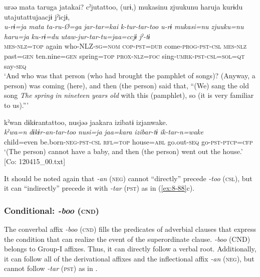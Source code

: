\ex
{\TM}
\glll  urəə  mata  taruga  jatakai?      cˀjutattoo,  (urɨ,)  mukasinu  {\textbar}zjuukunu      haru{\textbar}ja  kurɨdu  utajutattujaacjɨ  jˀicjɨ,\\
\textit{u-rɨ=ja}  \textit{mata}  \textit{ta-ru-Ø=ga}  \textit{jar-tar=kai}      \textit{k-tur-tar-too}  \textit{u-rɨ}  \textit{mukasi=nu}  \textit{zjuuku=nu}      \textit{haru=ja}  \textit{ku-rɨ=du}  \textit{utaw-jur-tar-tu=jaa=ccjɨ}  \textit{jˀ-tɨ}\\
\textsc{mes}-\textsc{nlz}=\textsc{top}  again  who-NLZ-\textsc{sg}=\textsc{nom}  \textsc{cop}-\textsc{pst}=\textsc{dub}      come-\textsc{prog}-\textsc{pst}-\textsc{csl}  \textsc{mes}-\textsc{nlz}  past=\textsc{gen}  ten.nine=\textsc{gen}  spring=\textsc{top}  \textsc{prox}-\textsc{nlz}=\textsc{foc}  sing-\textsc{umrk}-\textsc{pst}-\textsc{csl}=\textsc{sol}=\textsc{qt}  say-\textsc{seq}\\
\glt ‘And who was that person (who had brought the pamphlet of songs)? (Anyway, a person) was coming (here), and then (the person) said that, “(We) sang the old song \textit{The} \textit{spring} \textit{in} \textit{nineteen} \textit{years} \textit{old} with this (pamphlet), so (it is very familiar to us).”’

\ex
{\TM}
\glll  kˀwan  dɨkɨrantattoo,  nusjəə  jaakara      izibatɨ  izjanwake.\\
\textit{kˀwa=n}  \textit{dɨkɨr-an-tar-too}  \textit{nusi=ja}  \textit{jaa=kara}     \textit{izibar-tɨ}  \textit{ik-tar-n=wake}\\
child=even  be.born-\textsc{neg}-\textsc{pst}-\textsc{csl}  \textsc{rfl}=\textsc{top}  house=\textsc{abl}   go.out-\textsc{seq}  go-\textsc{pst}-\textsc{ptcp}=\textsc{cfp}\\
\glt ‘(The person) cannot have a baby, and then (the person) went out the house.’ [Co: 120415\_00.txt]
\z
\z

It should be noted again that \textit{-an} (\textsc{neg}) cannot “directly” precede \textit{-too} (\textsc{csl}), but it can “indirectly” precede it with \textit{-tar} (\textsc{pst}) as in (\ref{ex:8-88}c).

\subsubsection{Conditional: \textit{-boo} (\textsc{cnd})}

The converbal affix \textit{-boo} (\textsc{cnd}) fills the predicates of adverbial clauses that express the condition that can realize the event of the superordinate clause. \textit{-boo} (CND) belongs to Group-I affixes. Thus, it can directly follow a verbal root. Additionally, it can follow all of the derivational affixes and the inflectional affix \textit{-an} (\textsc{neg}), but cannot follow \textit{-tar} (\textsc{pst}) as in .

